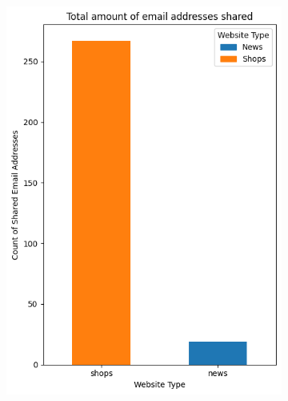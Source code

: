 \begin{figure}[h!]
\begin{subfigure}[b]{0.28\textwidth}
        \includegraphics[width=\textwidth]{./assets/comparison3.png}
        \caption{}
        \label{fig:emails}
    \end{subfigure}
    
    \label{fig:trackingmetrics}
\end{figure}

